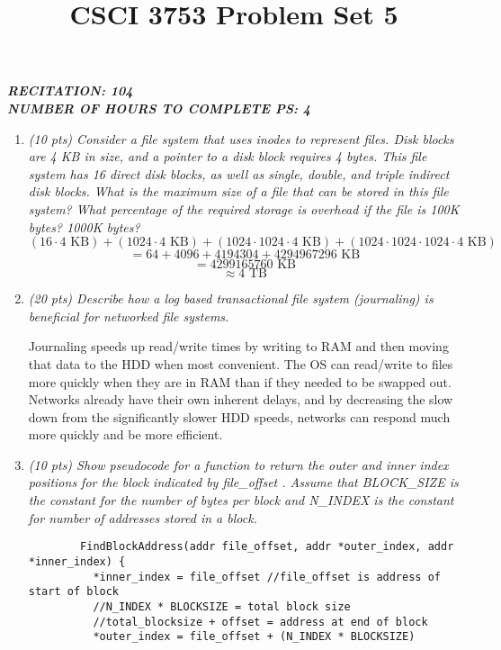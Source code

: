 \documentclass[12pt]{article}
\title{CSCI 3753 Problem Set 5}
\begin{document}

\textbf{\textit{RECITATION: 104}}\\
\textbf{\textit{NUMBER OF HOURS TO COMPLETE PS: 4}}

\begin{enumerate}
   	\item{\textit{(10 pts) Consider a file system that uses inodes to represent files. Disk blocks are 4 KB in size, and a pointer to a disk block requires 4 bytes. This file system has 16 direct disk blocks, as well as single, double, and triple indirect disk blocks. What is the maximum size of a file that can be stored in this file system? What percentage of the required storage is overhead if the file is 100K bytes? 1000K bytes?}}
	    \color{blue}
	    $$(16 \cdot 4\text{ KB}) + (1024 \cdot 4 \text{ KB}) + (1024 \cdot 1024 \cdot 4 \text{ KB}) + (1024 \cdot 1024 \cdot 1024 \cdot 4 \text{ KB})$$ $$= 64 + 4096 + 4194304 + 4294967296 \text{ KB}$$ $$= 4299165760 \text{ KB}$$ $$\approx 4 \text{ TB}$$
	    \color{black}
    \item{\textit{(20 pts) Describe how a log based transactional file system (journaling) is beneficial for networked file systems.}}
	   	\color{blue}
	   	\par Journaling speeds up read/write times by writing to RAM and then moving that data to the HDD when most convenient. The OS can read/write to files more quickly when they are in RAM than if they needed to be swapped out. Networks already have their own inherent delays, and by decreasing the slow down from the significantly slower HDD speeds, networks can respond much more quickly and be more efficient.
	    \color{black}
    \item{\textit{(10 pts) Show pseudocode for a function to return the outer and inner index positions for the block indicated by file\_offset . Assume that BLOCK\_SIZE is the constant for the number of bytes per block and N\_INDEX is the constant for number of addresses stored in a block.}}	
	    \color{blue}
		\begin{verbatim}
		FindBlockAddress(addr file_offset, addr *outer_index, addr *inner_index) {
		  *inner_index = file_offset //file_offset is address of start of block
		  //N_INDEX * BLOCKSIZE = total block size
		  //total_blocksize + offset = address at end of block
		  *outer_index = file_offset + (N_INDEX * BLOCKSIZE)

\end{verbatim}
\end{enumerate}
\end{document}

